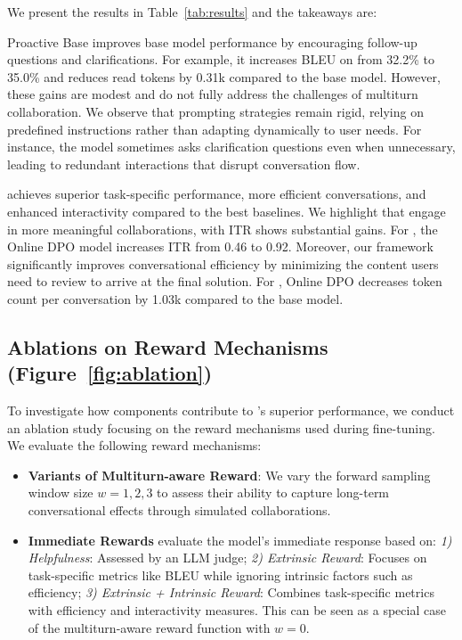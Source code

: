 We present the results in Table~\ref{tab:results} and the takeaways are:


Proactive Base improves base model performance by encouraging follow-up questions and clarifications. For example, it increases BLEU on \doc from 32.2\% to 35.0\% and reduces read tokens by 0.31k compared to the base model. However, these gains are modest and do not fully address the challenges of multiturn collaboration. We observe that prompting strategies remain rigid, relying on predefined instructions rather than adapting dynamically to user needs. For instance, the model sometimes asks clarification questions even when unnecessary, leading to redundant interactions that disrupt conversation flow.

\name{} achieves \taskimprov superior task-specific performance, \efficiencyimprov more efficient conversations, and \itrimprov enhanced interactivity compared to the best baselines.
We highlight that \name{} engage in more meaningful collaborations, with ITR shows substantial gains. For \doct, the Online DPO model increases ITR from 0.46 to 0.92. 
Moreover, our framework significantly improves conversational efficiency by minimizing the content users need to review to arrive at the final solution. For \mathct, Online DPO decreases token count per conversation by 1.03k compared to the base model.

\subsection{Ablations on Reward Mechanisms (Figure~\ref{fig:ablation})}
\label{sec:ablation}

To investigate how components contribute to \name{}'s superior performance, we conduct an ablation study focusing on the reward mechanisms used during fine-tuning. 
We evaluate the following reward mechanisms:
\begin{itemize}
    \item \textbf{Variants of Multiturn-aware Reward}: We vary the forward sampling window size $w=1,2,3$ to assess their ability to capture long-term conversational effects through simulated collaborations.
     \item \textbf{Immediate Rewards} evaluate the model's immediate response based on:
        \textit{1) Helpfulness}: Assessed by an LLM judge;
        \textit{2) Extrinsic Reward}: Focuses on task-specific metrics like BLEU while ignoring intrinsic factors such as efficiency;
        \textit{3) Extrinsic + Intrinsic Reward}: Combines task-specific metrics with efficiency and interactivity measures. This can be seen as a special case of the multiturn-aware reward function with $w=0$.
    
    
\end{itemize}

